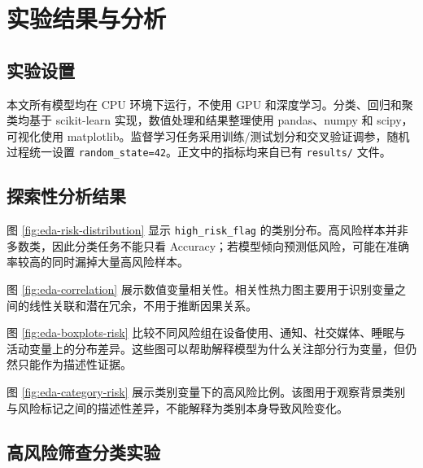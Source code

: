 \chapter{实验结果与分析}

\section{实验设置}

本文所有模型均在 CPU 环境下运行，不使用 GPU 和深度学习。分类、回归和聚类均基于 scikit-learn 实现，数值处理和结果整理使用 pandas、numpy 和 scipy，可视化使用 matplotlib。监督学习任务采用训练/测试划分和交叉验证调参，随机过程统一设置 \texttt{random\_state=42}。正文中的指标均来自已有 \texttt{results/} 文件。

\section{探索性分析结果}

图 \ref{fig:eda-risk-distribution} 显示 \texttt{high\_risk\_flag} 的类别分布。高风险样本并非多数类，因此分类任务不能只看 Accuracy；若模型倾向预测低风险，可能在准确率较高的同时漏掉大量高风险样本。


图 \ref{fig:eda-correlation} 展示数值变量相关性。相关性热力图主要用于识别变量之间的线性关联和潜在冗余，不用于推断因果关系。


图 \ref{fig:eda-boxplots-risk} 比较不同风险组在设备使用、通知、社交媒体、睡眠与活动变量上的分布差异。这些图可以帮助解释模型为什么关注部分行为变量，但仍然只能作为描述性证据。


图 \ref{fig:eda-category-risk} 展示类别变量下的高风险比例。该图用于观察背景类别与风险标记之间的描述性差异，不能解释为类别本身导致风险变化。


\section{高风险筛查分类实验}

